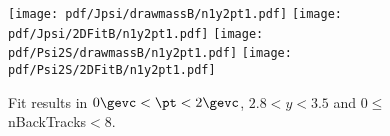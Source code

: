 \begin{figure}[H]
\begin{center}
\texttt{[image: pdf/Jpsi/drawmassB/n1y2pt1.pdf]}
\texttt{[image: pdf/Jpsi/2DFitB/n1y2pt1.pdf]}
\vspace*{-0.5cm}
\texttt{[image: pdf/Psi2S/drawmassB/n1y2pt1.pdf]}
\texttt{[image: pdf/Psi2S/2DFitB/n1y2pt1.pdf]}
\vspace*{-0.5cm}
\end{center}
\caption{Fit results in $0\gevc<\pt<2\gevc$, $2.8<y<3.5$ and 0$\leq$nBackTracks$<$8.}
\label{Fitn1y2pt1}
\end{figure}
